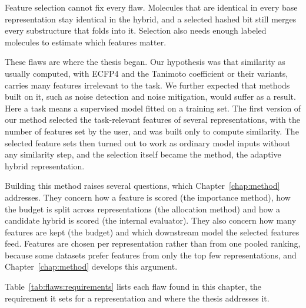 Feature selection cannot fix every flaw. Molecules that are identical in every base representation stay identical in the hybrid, and a selected hashed bit still merges every substructure that folds into it. Selection also needs enough labeled molecules to estimate which features matter.

These flaws are where the thesis began. Our hypothesis was that similarity as usually computed, with ECFP4 and the Tanimoto coefficient or their variants, carries many features irrelevant to the task. We further expected that methods built on it, such as noise detection and noise mitigation, would suffer as a result. Here a task means a supervised model fitted on a training set. The first version of our method selected the task-relevant features of several representations, with the number of features set by the user, and was built only to compute similarity. The selected feature sets then turned out to work as ordinary model inputs without any similarity step, and the selection itself became the method, the adaptive hybrid representation.

Building this method raises several questions, which Chapter~\ref{chap:method} addresses. They concern how a feature is scored (the importance method), how the budget is split across representations (the allocation method) and how a candidate hybrid is scored (the internal evaluator). They also concern how many features are kept (the budget) and which downstream model the selected features feed. Features are chosen per representation rather than from one pooled ranking, because some datasets prefer features from only the top few representations, and Chapter~\ref{chap:method} develops this argument.

Table~\ref{tab:flaws:requirements} lists each flaw found in this chapter, the requirement it sets for a representation and where the thesis addresses it.


